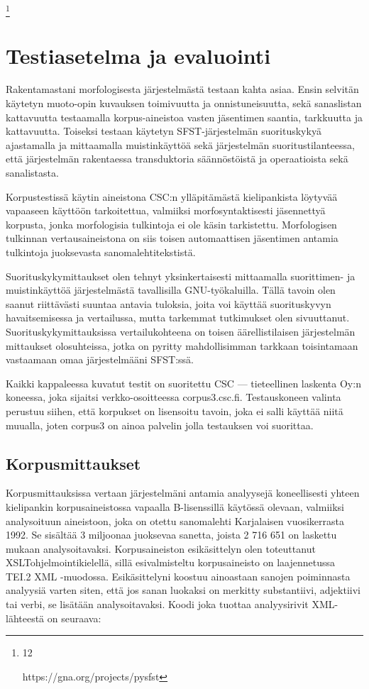 \documentclass[free]{flammie}
\begin{document}
\footnote{12

https://gna.org/projects/pysfst
}

\section{Testiasetelma ja evaluointi}

Rakentamastani morfologisesta järjestelmästä testaan kahta asiaa. Ensin selvitän
käytetyn muoto-opin kuvauksen toimivuutta ja onnistuneisuutta, sekä sanaslistan
kattavuutta testaamalla korpus-aineistoa vasten jäsentimen saantia, tarkkuutta ja
kattavuutta. Toiseksi testaan käytetyn SFST-järjestelmän suorituskykyä ajastamalla ja mittaamalla muistinkäyttöä sekä järjestelmän suoritustilanteessa, että järjestelmän rakentaessa transduktoria säännöstöistä ja operaatioista sekä sanalistasta.

Korpustestissä käytin aineistona CSC:n ylläpitämästä kielipankista löytyvää vapaaseen käyttöön tarkoitettua, valmiiksi morfosyntaktisesti jäsennettyä korpusta,
jonka morfologisia tulkintoja ei ole käsin tarkistettu. Morfologisen tulkinnan vertausaineistona on siis toisen automaattisen jäsentimen antamia tulkintoja juoksevasta sanomalehtitekstistä.

Suorituskykymittaukset olen tehnyt yksinkertaisesti mittaamalla suorittimen- ja
muistinkäyttöä järjestelmästä tavallisilla GNU-työkaluilla. Tällä tavoin olen saanut riittävästi suuntaa antavia tuloksia, joita voi käyttää suorituskyvyn havaitsemisessa ja vertailussa, mutta tarkemmat tutkimukset olen sivuuttanut. Suorituskykymittauksissa vertailukohteena on toisen äärellistilaisen järjestelmän mittaukset
olosuhteissa, jotka on pyritty mahdollisimman tarkkaan toisintamaan vastaamaan
omaa järjestelmääni SFST:ssä.

Kaikki kappaleessa kuvatut testit on suoritettu CSC — tieteellinen laskenta Oy:n
koneessa, joka sijaitsi verkko-osoitteessa corpus3.csc.fi. Testauskoneen
valinta perustuu siihen, että korpukset on lisensoitu tavoin, joka ei salli käyttää
niitä muualla, joten corpus3 on ainoa palvelin jolla testauksen voi suorittaa.

\subsection{Korpusmittaukset}

Korpusmittauksissa vertaan järjestelmäni antamia analyysejä koneellisesti yhteen
kielipankin korpusaineistossa vapaalla B-lisenssillä käytössä olevaan, valmiiksi analysoituun aineistoon, joka on otettu sanomalehti Karjalaisen vuosikerrasta 1992. Se sisältää 3 miljoonaa juoksevaa sanetta, joista 2 716 651 on laskettu mukaan analysoitavaksi. Korpusaineiston esikäsittelyn olen toteuttanut XSLTohjelmointikielellä, sillä esivalmisteltu korpusaineisto on laajennetussa TEI.2
XML -muodossa. Esikäsittelyni koostuu ainoastaan sanojen poiminnasta analyysiä varten siten, että jos sanan luokaksi on merkitty substantiivi, adjektiivi tai verbi, se lisätään analysoitavaksi. Koodi joka tuottaa analyysirivit XML-lähteestä on
seuraava:
\end{document}
